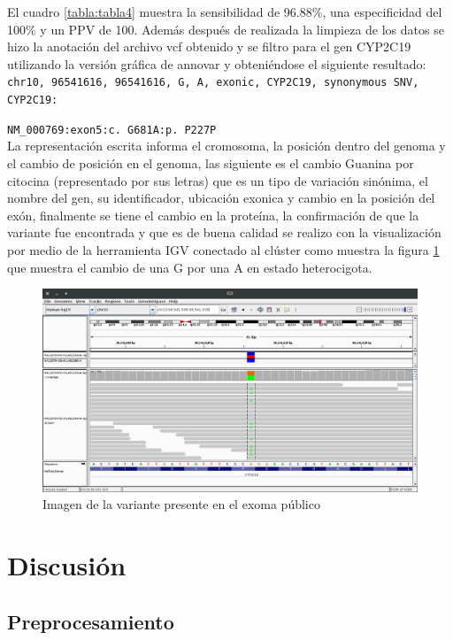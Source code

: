 El cuadro \ref{tabla:tabla4} muestra la sensibilidad de 96.88\%, una especificidad del 100\% y un PPV de 100. Además después de realizada la limpieza de los datos se hizo la anotación del archivo vcf obtenido y se filtro para el gen CYP2C19 utilizando la versión gráfica de annovar \cite{Yang2015} y obteniéndose el siguiente resultado: \\

\texttt{chr10, 96541616, 96541616, G, A, exonic, CYP2C19, synonymous SNV, CYP2C19:}

\texttt{NM\_000769:exon5:c. G681A:p. P227P} \\

La representación escrita informa el cromosoma, la posición dentro del genoma y el cambio de posición en el genoma, las siguiente es el cambio Guanina por citocina (representado por sus letras) que es un tipo de variación sinónima, el nombre del gen, su identificador, ubicación exonica y cambio en la posición del exón, finalmente se tiene el cambio en la proteína, la confirmación de que la variante fue encontrada y que es de buena calidad se realizo  con la visualización por medio de la herramienta IGV conectado al clúster como muestra la figura \ref{fig:igv} que muestra el cambio de una G por una A en estado heterocigota. 

\begin{figure}[H]
	\centering
	\includegraphics[width=1\textwidth]{Kap2/IGV}
	\caption{Imagen de la variante presente en el exoma público} \label{fig:igv}
\end{figure}

\section{Discusión}

\subsection*{Preprocesamiento}

